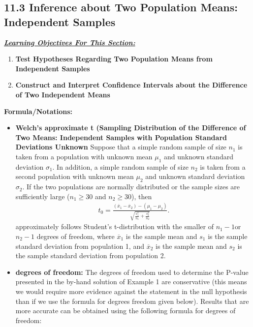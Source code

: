\documentclass{report}
\begin{document}
    \subsection*{11.3 Inference about Two Population Means: Independent Samples}
    \bigbreak \noindent 
    \bigbreak \noindent 
    \textbf{\textit{\underline{Learning Objectives For This Section:}}}
    \begin{enumerate}
        \item \textbf{Test Hypotheses Regarding Two Population Means from Independent Samples}
        \item \textbf{Construct and Interpret Confidence Intervals about the Difference of Two Independent Means}
    \end{enumerate}
    \bigbreak \noindent \bigbreak \noindent 
    \textbf{Formula/Notations:}
    \begin{itemize}
        \item \textbf{Welch's approximate t (Sampling Distribution of the Difference of Two Means: Independent Samples with Population Standard Deviations Unknown }
            Suppose that a simple random sample of size $n_1$ is taken from a population with unknown mean $\mu_1$ and unknown standard deviation $\sigma_1$. In addition, a simple random sample of size $n_2$ is taken from a second population with unknown mean $\mu_2$ and unknown standard deviation $\sigma_2$. If the two populations are normally distributed or the sample sizes are sufficiently large ($n_1 \geq 30$ and $n_2 \geq 30$), then
            \begin{align*}
                t_{0} = \frac{(\overline{x}_{1} - \overline{x}_{2}) - (\mu_{1} - \mu_{2})}{\sqrt{\frac{s_{1}^{2}}{n_{1}} + \frac{s_{2}^{2}}{n_{2}}}}
            .\end{align*}
        approximately  follows Student's t-distribution with the smaller of  $n_{1} -1 $or  $n_{2}-1 $ degrees of freedom, where $\overline{x}_{1} $ is the sample mean and $s_{1} $ is the sample standard deviation from population 1, and $\overline{x}_{2} $ is the sample mean and $s_{2}$ is the sample standard deviation from population 2.
        \item \textbf{degrees of freedom:}
            The degrees of freedom used to determine the P-value presented in the by-hand solution of Example 1 are conservative (this means we would require more evidence against the statement in the null hypothesis than if we use the formula for degrees freedom given below).
            \bigbreak \noindent 
            Results that are more accurate can be obtained using the following formula for degrees of freedom:

\end{itemize}
\end{document}
